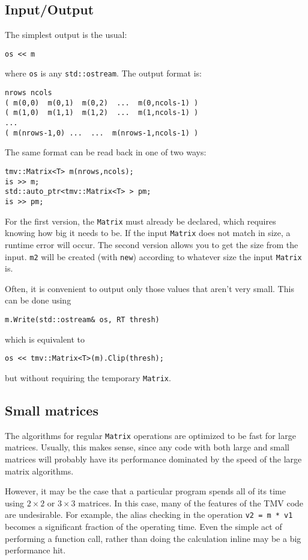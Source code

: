 \documentclass[twoside,letterpaper,11pt]{article}
\renewcommand{\tt}[1]{{\texttt {#1}}}
\begin{document}
\subsection{Input/Output}

The simplest output is the usual:
\begin{verbatim}
os << m
\end{verbatim}
where \tt{os} is any \tt{std::ostream}.
The output format is:
\begin{verbatim}
nrows ncols
( m(0,0)  m(0,1)  m(0,2)  ...  m(0,ncols-1) )
( m(1,0)  m(1,1)  m(1,2)  ...  m(1,ncols-1) )
...
( m(nrows-1,0) ...  ...  m(nrows-1,ncols-1) )
\end{verbatim}

The same format can be read back in one of two ways:
\begin{verbatim}
tmv::Matrix<T> m(nrows,ncols);
is >> m;
std::auto_ptr<tmv::Matrix<T> > pm;
is >> pm;
\end{verbatim}
For the first version, the \tt{Matrix} must already be declared, which 
requires knowing how big it needs to be.  If the input \tt{Matrix} does not
match in size, a runtime error will occur.
The second version allows you to get the size from the input.  \tt{m2}
will be created (with \tt{new}) 
according to whatever size the input \tt{Matrix} is.

Often, it is convenient to output only those values that aren't very small. 
This can be done using
\begin{verbatim}
m.Write(std::ostream& os, RT thresh)
\end{verbatim}
which is equivalent to
\begin{verbatim}
os << tmv::Matrix<T>(m).Clip(thresh);
\end{verbatim}
but without requiring the temporary \tt{Matrix}.

\subsection{Small matrices}

The algorithms for regular \tt{Matrix} operations are optimized to be
fast for large matrices.  Usually, this makes sense, since any code with
both large and small matrices will probably have its performance dominated
by the speed of the large matrix algorithms.

However, it may be the case that a particular program spends all of its
time using $2 \times 2$ or $3 \times 3$ matrices.  In this case, 
many of the features of the TMV code are undesirable.  For example, 
the alias checking in the operation \tt{v2 = m * v1} becomes a significant
fraction of the operating time.  Even the simple act of performing a function
call, rather than doing the calculation inline may be a big performance hit.
\end{document}
